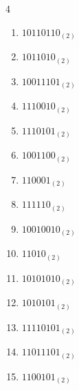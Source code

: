 \begin{multicols}{4}
\begin{enumerate}
        \phantom{$=82$}

  \item $10110110_{(2)}$

        \phantom{$=182$}

\columnbreak %

  \item $1011010_{(2)}$

        \phantom{$=90$}

  \item $10011101_{(2)}$

        \phantom{$=157$}

  \item $1110010_{(2)}$

        \phantom{$=114$}

  \item $1110101_{(2)}$

        \phantom{$=117$}

  \item $1001100_{(2)}$

        \phantom{$=76$}

  \item $110001_{(2)}$

        \phantom{$=49$}

  \item $111110_{(2)}$

        \phantom{$=62$}

  \item $10010010_{(2)}$

        \phantom{$=146$}

  \item $11010_{(2)}$

        \phantom{$=26$}

  \item $10101010_{(2)}$

        \phantom{$=170$}

  \item $1010101_{(2)}$

        \phantom{$=85$}

  \item $11110101_{(2)}$

        \phantom{$=245$}

  \item $11011101_{(2)}$

        \phantom{$=221$}

  \item $1100101_{(2)}$


\end{enumerate}
\end{multicols}
